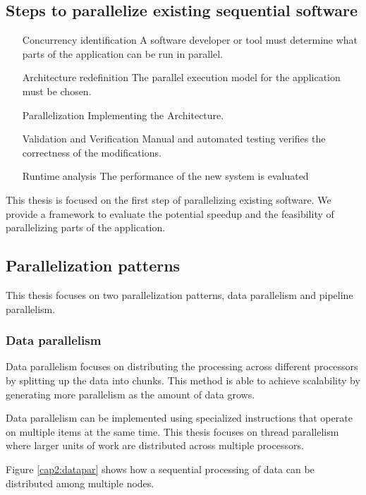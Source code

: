 \subsection{Steps to parallelize existing sequential software}

\begin{enumerate}[\hspace{80pt}(P1)]
	\item [Concurrency identification] A software developer or tool must determine what parts of the application can be run in parallel.
	\item [Architecture redefinition] The parallel execution model for the application must be chosen.
	\item [Parallelization] Implementing the Architecture.
	\item [Validation and Verification] Manual and automated testing verifies the correctness of the modifications.
	\item [Runtime analysis] The performance of the new system is evaluated
\end{enumerate}

This thesis is focused on the first step of parallelizing existing software. We provide a framework to evaluate the potential speedup and the feasibility of parallelizing parts of the application.

\subsection{Parallelization patterns}

This thesis focuses on two parallelization patterns, data parallelism and pipeline parallelism.

\subsubsection{Data parallelism}

Data parallelism \cite{parbook} focuses on distributing the processing across different processors by splitting up the data into chunks. This method is able to achieve scalability by generating more parallelism as the amount of data grows.

Data parallelism can be implemented using specialized instructions that operate on multiple items at the same time. This thesis focuses on thread parallelism where larger units of work are distributed across multiple processors.

Figure \ref{cap2:datapar} shows how a sequential processing of data can be distributed among multiple nodes.

